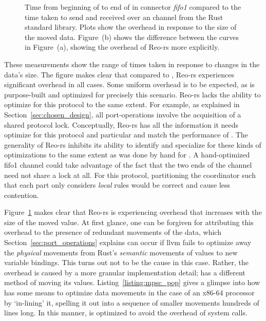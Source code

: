 \begin{figure}
{\begin{subfigure}[b]{0.63\textwidth}
			\caption{}
			\label{fig:exper_rtt_01}
		\end{subfigure}%
	}
	\caption[Performance of fifo1 connector vs.\ a standard channel type.]{Time from beginning of  to end of  in connector \textit{fifo1} compared to the time taken to send and received over an  channel from the Rust standard library. Plots show the overhead in response to the size of the moved data. Figure~(b) shows the difference between the curves in Figure~(a), showing the overhead of Reo-rs more explicitly.}
	\label{fig:exper_rtt}
\end{figure}


These measurements show the range of times taken in response to changes in the data's size. The figure makes clear that compared to , Reo-rs experiences significant overhead in all cases. Some uniform overhead is to be expected, as  is purpose-built and optimized for precisely this scenario. Reo-rs lacks the ability to optimize for this protocol to the same extent. For example, as explained in Section~\ref{sec:chosen_design}, all port-operations involve the acquisition of a shared protocol lock. Conceptually, Reo-rs has all the information it needs optimize for this protocol and particular and match the performance of . The generality of Reo-rs inhibits its ability to identify and specialize for these kinds of optimizations to the same extent as was done by hand for . A hand-optimized fifo1 channel could take advantage of the fact that the two ends of the channel need not share a lock at all. For this protocol, partitioning the coordinator such that each part only considers \textit{local} rules would be correct and cause less contention.

Figure~\ref{fig:exper_rtt_01} makes clear that Reo-rs is experiencing overhead that increases with the size of the moved value. At first glance, one can be forgiven for attributing this overhead to the presence of redundant movements of the data, which Section~\ref{sec:port_operations} explains can occur if llvm fails to optimize away the \textit{physical} movements from Rust's \textit{semantic} movements of values to new variable bindings. This turns out not to be the cause in this case. Rather, the overhead is caused by a more granular implementation detail;  has a different method of moving its values. Listing~\ref{listing:mpsc_pop} gives a glimpse into how  has some means to optimize data movements in the case of an x86-64 processor by `in-lining' it, spelling it out into a sequence of smaller movements hundreds of lines long. In this manner,  is optimized to avoid the overhead of system calls.

